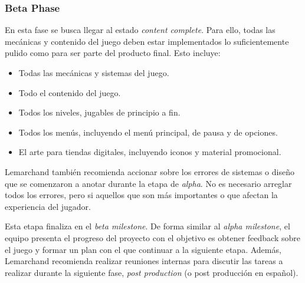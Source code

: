 \subsubsection{Beta Phase}
\par En esta fase se busca llegar al estado \textit{content complete}. Para ello, todas las mecánicas y contenido del juego deben estar implementados lo suficientemente pulido como para ser parte del producto final. Esto incluye:
\begin{itemize}
    \item Todas las mecánicas y sistemas del juego.
    \item Todo el contenido del juego.
    \item Todos los niveles, jugables de principio a fin.
    \item Todos los menús, incluyendo el menú principal, de pausa y de opciones.
    \item El arte para tiendas digitales, incluyendo iconos y material promocional.
\end{itemize}
\par Lemarchand también recomienda accionar sobre los errores de sistemas o diseño que se comenzaron a anotar durante la etapa de \textit{alpha}. No es necesario arreglar todos los errores, pero si aquellos que son más importantes o que afectan la experiencia del jugador.
\bigbreak
\par Esta etapa finaliza en el \textit{beta milestone}. De forma similar al \textit{alpha milestone}, el equipo presenta el progreso del proyecto con el objetivo es obtener feedback sobre el juego y formar un plan con el que continuar a la siguiente etapa. Además, Lemarchand recomienda realizar reuniones internas para discutir las tareas a realizar durante la siguiente fase, \textit{post production} (o post producción en español). 
%
%
%
